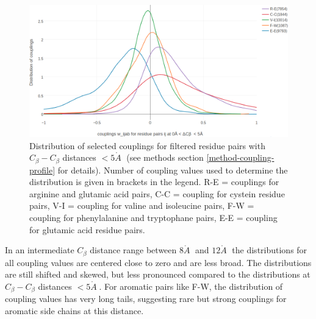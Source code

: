 \documentclass[12pt,a4paper,twoside]{book}
\newcommand{\Cb}{C_\beta}
\newcommand{\angstrom}{\mathring{A} \;}
\theoremstyle{definition}
\theoremstyle{definition}
\theoremstyle{remark}
\begin{document}
\begin{figure}

{\centering \includegraphics[width=0.9\linewidth]{img/coupling_matrix_analysis/1d_coupling_profile_0_5} 

}

\caption{Distribution of selected couplings
for filtered residue pairs with \(\Cb-\Cb\) distances \(< 5\angstrom\)
(see methods section \ref{method-coupling-profile} for details). Number
of coupling values used to determine the distribution is given in
brackets in the legend. R-E = couplings for arginine and glutamic acid
pairs, C-C = coupling for cystein residue pairs, V-I = coupling for
valine and isoleucine pairs, F-W = coupling for phenylalanine and
tryptophane pairs, E-E = coupling for glutamic acid residue pairs.}\label{fig:1d-coupling-profile-0-5}
\end{figure}

In an intermediate \(\Cb\) distance range between \(8\angstrom\) and
\(12\angstrom\) the distributions for all coupling values are centered
close to zero and are less broad. The distributions are still shifted
and skewed, but less pronounced compared to the distributions at
\(\Cb-\Cb\) distances \(< 5\angstrom\). For aromatic pairs like F-W, the
distribution of coupling values has very long tails, suggesting rare but
strong couplings for aromatic side chains at this distance.
\end{document}
